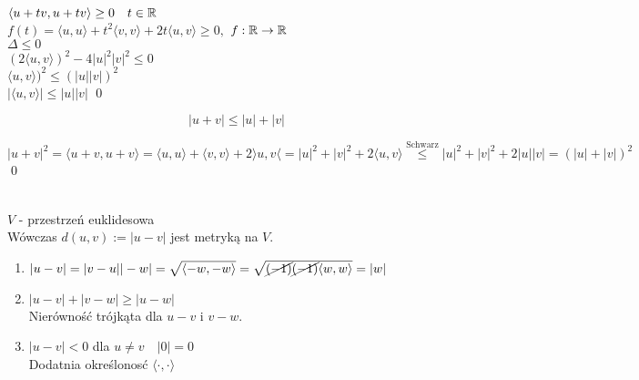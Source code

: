 \begin{dd} ~\\ 
    $\langle u +tv, u +tv \rangle \ge 0 \quad t \in \mathbb{R}$ \\ 
    $f(t) = \langle u,u \rangle + t^2 \langle v,v \rangle + 2t \langle u, v \rangle \ge 0,$
    $f: \mathbb{R} \to \mathbb{R}$ \\ 
    $\Delta \le 0$ \\
    $(2 \langle u,v \rangle)^2 - 4 |u|^2 |v|^2 \le 0$ \\ 
    $ \langle u,v \rangle )^2 \le (|u||v|)^2 $ \\ 
    $ |\langle u, v \rangle| \le |u| |v|$ \hfill \qed
\end{dd} 
\begin{ft} 
    \[ |u+v| \le |u| + |v| \]
\end{ft} 
\begin{dd} 
    $|u+v|^2 = \langle u+v, u+v \rangle = \langle u, u \rangle + \langle v, v \rangle + 
    2 \rangle u, v \langle = |u|^2 + |v|^2 + 2 \langle u, v \rangle \overset{\text{Schwarz}
    }{\le} |u|^2 + |v|^2 + 2|u||v| = (|u| + |v|)^2$ \hfill \qed
\end{dd} 
\begin{wn} ~\\ 
    $V$ - przestrzeń euklidesowa \\ 
    Wówczas $d(u,v) := |u-v|$ jest metryką na $V$. 
\end{wn} 
\begin{dd} \hfill 
    \begin{enumerate}[(1)] 
        \item $|u-v| = |v-u| \\ 
            |-w| = \sqrt{\langle -w,-w \rangle} = \sqrt{\cancel{(-1)}\cancel{(-1)}
            \langle w, w \rangle } = |w|$
        \item $|u-v| + |v-w| \ge |u-w|$ \\ 
            Nierówność trójkąta dla $u-v$ i $v-w$. 
        \item $|u - v| < 0 $ dla $u \neq v \quad |0| = 0$ \\ 
            Dodatnia określonosć $\langle \cdot, \cdot \rangle$
    \end{enumerate} 
\end{dd}
